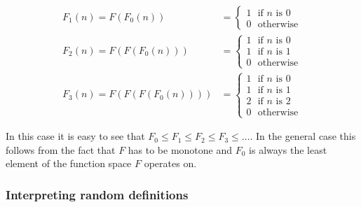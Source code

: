 \documentclass[11pt, leqno]{article}
\theoremstyle{definition}
\begin{document}
\begin{align*}
  F_1(n) = F(F_0(n)) & = \begin{cases}
                           1~~~\text{if }n\text{ is 0}\\
                           0~~~\text{otherwise}
                         \end{cases}
  \\
  F_2(n) = F(F(F_0(n))) & = \begin{cases}
                             1~~~\text{if }n\text{ is 0}\\
                             1~~~\text{if }n\text{ is 1}\\
                             0~~~\text{otherwise}
                           \end{cases}
  \\
  F_3(n) = F(F(F(F_0(n)))) & = \begin{cases}
                                1~~~\text{if }n\text{ is 0}\\
                                1~~~\text{if }n\text{ is 1}\\
                                2~~~\text{if }n\text{ is 2}\\
                                0~~~\text{otherwise}
                              \end{cases}
\end{align*}

In this case it is easy to see that $F_0 \leq F_1 \leq F_2 \leq F_3 \leq \dots$. In
the general case this follows from the fact that $F$ has to be monotone and $F_0$ is
always the least element of the function space $F$ operates on. 


\subsubsection{Interpreting random definitions}\label{sec:random-interp}

\end{document}

